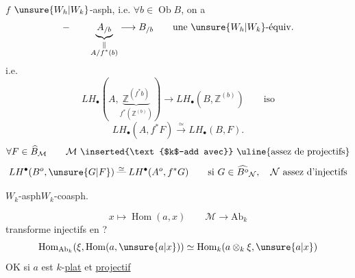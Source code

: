
$f$ $\unsure{W_h|W_k}$-asph, i.e. $\forall b\in\operatorname{Ob}B$, on a
\[
-\qquad \underbrace{A_{/b}}_{\displaystyle\substack{\Vert\\ A/f^*(b)}}\longrightarrow B_{/b}
\qquad\text{une }\unsure{W_h|W_k}\text{-équiv.}
\]
i.e.
\[
LH_\bullet\left(A,\underbrace{\mathbb Z^{(f^*b)}}_{f^*(\mathbb Z^{(b)})}\right)
\longrightarrow LH_\bullet(B,\mathbb Z^{(b)})\qquad\text{iso}
\]
\[
LH_\bullet(A,f^*F)\xrightarrow{\simeq}LH_\bullet(B,F).
\]
\[
\forall F\in\widehat B_{\mathcal M}\qquad
\mathcal M\ \inserted{\text{$k$-add avec}}\ \text{\uline{assez de projectifs}}
\]
\[
LH^\bullet(B^o,\unsure{G|F})\overset{\simeq}{\mathbin{\text{---}}}LH^\bullet(A^o,f^*G)
\qquad\text{si }G\in\widehat{B^o}_{\mathcal N},\quad\mathcal N\text{ assez d'injectifs}
\]

$W_k$-asph\qquad $W_k$-coasph.

\[
x\longmapsto\operatorname{Hom}(a,x)\qquad\mathcal M\longrightarrow\mathrm{Ab}_k
\]
transforme injectifs en  ?
\[
\operatorname{Hom}_{\mathrm{Ab}_k}(\xi,\operatorname{Hom}(a,\unsure{a|x}))
\simeq\operatorname{Hom}_k(a\otimes_k\xi,\unsure{a|x})
\]
OK si $a$ est $k$-\uline{plat} et \uline{projectif}
